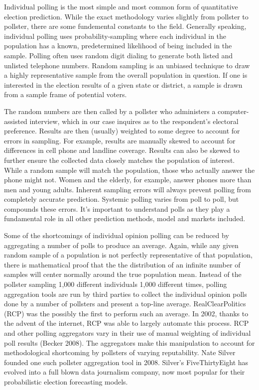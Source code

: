 \documentclass[]{article}
\begin{document}
Individual polling is the most simple and most common form of
quantitative election prediction. While the exact methodology varies
slightly from pollster to pollster, there are some fundemental constants
to the field. Generally speaking, individual polling uses
probability-sampling where each individual in the population has a
known, predetermined likelihood of being included in the sample. Polling
often uses random digit dialing to generate both listed and unlisted
telephone numbers. Random sampling is an unbiased technique to draw a
highly representative sample from the overall population in question. If
one is interested in the election results of a given state or district,
a sample is drawn from a sample frame of potential voters.

The random numbers are then called by a pollster who administers a
computer-assisted interview, which in our case inquires as to the
respondent's electoral preference. Results are then (usually) weighted
to some degree to account for errors in sampling. For example, results
are manually skewed to account for differences in cell phone and
landline coverage. Results can also be skewed to further ensure the
collected data closely matches the population of interest. While a
random sample will match the population, those who actually answer the
phone might not. Women and the elderly, for example, answer phones more
than men and young adults. Inherent sampling errors will always prevent
polling from completely accurate prediction. Systemic polling varies
from poll to poll, but compounds these errors. It's important to
understand polls as they play a fundamental role in all other prediction
methods, model and markets included.

Some of the shortcomings of individual opinion polling can be reduced by
aggregating a number of polls to produce an average. Again, while any
given random sample of a population is not perfectly representative of
that population, there is mathematical proof that the the distribution
of an infinite number of samples will center normally around the true
population mean. Instead of the pollster sampling 1,000 different
individuals 1,000 different times, polling aggregation tools are run by
third parties to collect the individual opinion polls done by a number
of pollsters and present a top-line average. RealClearPolitics (RCP) was
the possibly the first to perform such an average. In 2002, thanks to
the advent of the internet, RCP was able to largely automate this
process. RCP and other polling aggregators vary in their use of manual
weighting of individual poll results (Becker 2008). The aggregators make
this manipulation to account for methodological shortcoming by pollsters
of varying reputability. Nate Silver founded one such pollster
aggregation tool in 2008. Silver's FiveThirtyEight has evolved into a
full blown data journalism company, now most popular for their
probabilistic election forecasting models.
\end{document}
